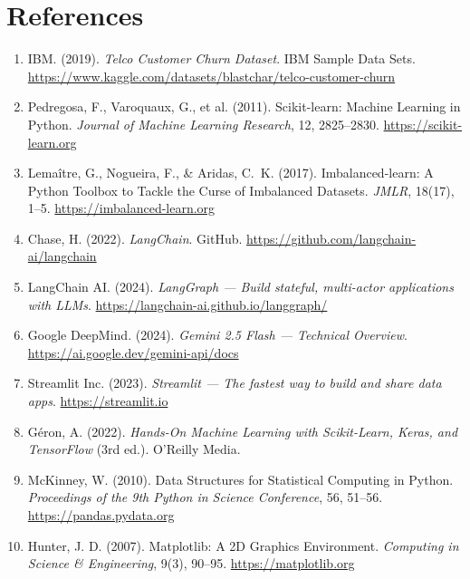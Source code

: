 \documentclass[12pt,a4paper]{article}
\begin{document}
\newpage
\section*{References}

\begin{enumerate}[leftmargin=2em, itemsep=6pt]
    \item IBM. (2019). \textit{Telco Customer Churn Dataset}. IBM Sample Data Sets.
          \url{https://www.kaggle.com/datasets/blastchar/telco-customer-churn}

    \item Pedregosa, F., Varoquaux, G., et al. (2011). Scikit-learn: Machine Learning in Python.
          \textit{Journal of Machine Learning Research}, 12, 2825--2830.
          \url{https://scikit-learn.org}

    \item Lema\^{i}tre, G., Nogueira, F., \& Aridas, C.~K. (2017). Imbalanced-learn: A Python Toolbox
          to Tackle the Curse of Imbalanced Datasets. \textit{JMLR}, 18(17), 1--5.
          \url{https://imbalanced-learn.org}

    \item Chase, H. (2022). \textit{LangChain}. GitHub.
          \url{https://github.com/langchain-ai/langchain}

    \item LangChain AI. (2024). \textit{LangGraph --- Build stateful, multi-actor applications with LLMs}.
          \url{https://langchain-ai.github.io/langgraph/}

    \item Google DeepMind. (2024). \textit{Gemini 2.5 Flash --- Technical Overview}.
          \url{https://ai.google.dev/gemini-api/docs}

    \item Streamlit Inc. (2023). \textit{Streamlit --- The fastest way to build and share data apps}.
          \url{https://streamlit.io}

    \item G\'{e}ron, A. (2022). \textit{Hands-On Machine Learning with Scikit-Learn, Keras, and TensorFlow}
          (3rd ed.). O'Reilly Media.

    \item McKinney, W. (2010). Data Structures for Statistical Computing in Python.
          \textit{Proceedings of the 9th Python in Science Conference}, 56, 51--56.
          \url{https://pandas.pydata.org}

    \item Hunter, J. D. (2007). Matplotlib: A 2D Graphics Environment.
          \textit{Computing in Science \& Engineering}, 9(3), 90--95.
          \url{https://matplotlib.org}
\end{enumerate}

\end{document}
